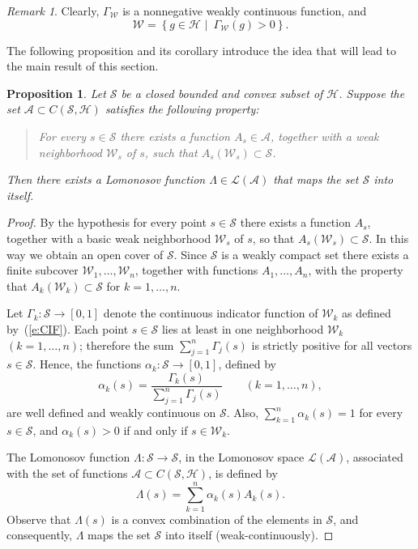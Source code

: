 \documentclass{tran-l}
\newtheorem{prop}[thm]{Proposition}
\theoremstyle{definition}
\theoremstyle{remark}
\newtheorem{rem}[thm]{Remark}
\numberwithin{equation}{subsection}
\newcommand{\To}{\longrightarrow}
\newcommand{\h}{\mathcal{H}}
\newcommand{\s}{\mathcal{S}}
\newcommand{\A}{\mathcal{A}}
\newcommand{\W}{\mathcal{W}}
\newcommand{\Lom}{\mathcal{L}}
\newcommand{\set}[1]{\left\{#1\right\}}
\begin{document}
\begin{rem}
Clearly, $\Gamma_\W$ is a nonnegative weakly continuous function, and
\[ \W = \set{g\in\h\,\,|\,\,\,\Gamma_\W(g)>0}. \]
\end{rem}

The following proposition and its corollary introduce the idea that will lead to the main result of this section.

\begin{prop} \label{p:wAPPROX}
Let $\s$ be a closed bounded and convex subset of $\h$. Suppose the set $\A\subset{C}(\s,\h)$ satisfies the following property:
\begin{quote}
  {For every $s\in\s$ there exists a function $A_s\in\A$, together with a weak neighborhood $\W_s$ of $s$, such that $A_s(\W_s)\subset\s$.}
\end{quote}
Then there exists a Lomonosov function $\Lambda\in\Lom(\A)$ that maps the set $\s$ into itself.
\end{prop}

\begin{proof}
By the hypothesis for every point $s\in\s$ there exists a function $A_s$, together with a basic weak neighborhood $\W_s$ of $s$, so that $A_s(\W_s)\subset\s$. In this way we obtain an open cover of $\s$. Since $\s$ is a weakly compact set there exists a finite subcover $\W_1,\ldots,\W_n$, together with functions $A_1,\ldots,A_n$, with the property that $A_k(\W_k)\subset\s$ for $k=1,\ldots,n$.

Let $\Gamma_k\colon\s\To[0,1]$ denote the continuous indicator function of $\W_k$ as defined by~(\ref{e:CIF}). Each point $s\in\s$ lies at least in one neighborhood $\W_k$ $(k=1,\ldots,n)$; therefore the sum $\sum_{j=1}^n\Gamma_j(s)$ is strictly positive for all vectors $s\in\s$. Hence, the functions $\alpha_k\colon\s\To[0,1]$, defined by
\[ \alpha_k(s) = \frac{\Gamma_k(s)}{\sum_{j=1}^n \Gamma_j(s)}
   \quad\quad  (k=1,\ldots,n), \]
are well defined and weakly continuous on $\s$. Also, $\sum_{k=1}^n\alpha_k(s)=1$ for every $s\in\s$, and $\alpha_k(s)>0$ if and only if $s\in\W_k$.

The Lomonosov function $\Lambda\colon\s\To\s$, in the Lomonosov space $\Lom(\A)$, associated with the set of functions $\A\subset{C}(\s,\h)$, is defined by
\[ \Lambda(s) = \sum_{k=1}^n \alpha_k(s) A_k(s). \]
Observe that $\Lambda(s)$ is a convex combination of the elements in $\s$, and consequently, $\Lambda$ maps the set $\s$ into itself (weak-continuously).
\end{proof}
\end{document}
